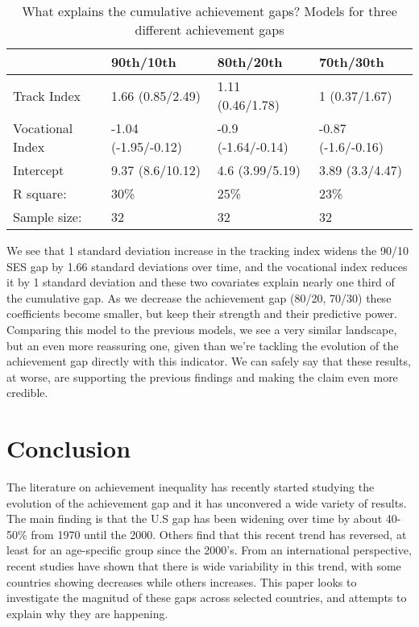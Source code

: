 \documentclass[11pt, a4paper]{article}\usepackage[]{graphicx}\usepackage[]{color}
\begin{document}
\begin{table}[ht]
\centering
\begin{tabular}{llll}
  \hline
  & 90th/10th & 80th/20th & 70th/30th \\ 
  \hline
Track Index & 1.66 (0.85/2.49) & 1.11 (0.46/1.78) & 1 (0.37/1.67) \\ 
  Vocational Index & -1.04 (-1.95/-0.12) & -0.9 (-1.64/-0.14) & -0.87 (-1.6/-0.16) \\ 
  Intercept & 9.37 (8.6/10.12) & 4.6 (3.99/5.19) & 3.89 (3.3/4.47) \\ 
   \hline R square: & 30\% & 25\% & 23\% \\ Sample size: & 32 & 32 & 32 \\ \hline \hline
\end{tabular}
\caption{What explains the cumulative achievement gaps? Models for three different achievement gaps} 
\end{table}


We see that 1 standard deviation increase in the tracking index widens the 90/10 SES gap by 1.66 standard deviations over time, and the vocational index reduces it by 1 standard deviation and these two covariates explain nearly one third of the cumulative gap. As we decrease the achievement gap (80/20, 70/30) these coefficients become smaller, but keep their strength and their predictive power. Comparing this model to the previous models, we see a very similar landscape, but an even more reassuring one, given than we're tackling the evolution of the achievement gap directly with this indicator. We can safely say that these results, at worse, are supporting the previous findings and making the claim even more credible.



\section{Conclusion}

The literature on achievement inequality has recently started studying the evolution of the achievement gap and it has unconvered a wide variety of results. The main finding is that the U.S gap has been widening over time by about 40-50\% from 1970 until the 2000. Others find that this recent trend has reversed, at least for an age-specific group since the 2000's. From an international perspective, recent studies have shown that there is wide variability in this trend, with some countries showing decreases while others increases. This paper looks to investigate the magnitud of these gaps across selected countries, and attempts to explain why they are happening.
\end{document}
